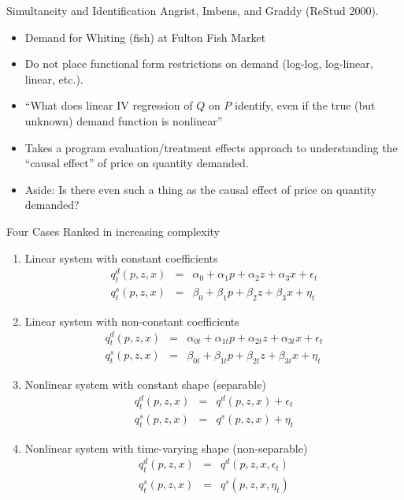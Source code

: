 \documentclass[xcolor=pdftex,dvipsnames,table,mathserif,aspectratio=169]{beamer}
\begin{document}
\begin{frame}{Simultaneity and Identification}
Angrist, Imbens, and Graddy (ReStud 2000).
\begin{itemize}
\item Demand for Whiting (fish) at Fulton Fish Market
\item Do not place functional form restrictions on demand (log-log, log-linear, linear, etc.).
\item ``What does linear IV regression of $Q$ on $P$ identify, even if the true (but unknown) demand function is nonlinear''
\item Takes a program evaluation/treatment effects approach to understanding the ``causal effect'' of price on quantity demanded.
\item Aside: Is there even such a thing as the causal effect of price on quantity demanded?
\end{itemize}
\end{frame}

\begin{frame}{Four Cases}
Ranked in increasing complexity
\footnotesize
\begin{enumerate}
\item Linear system with constant coefficients
\begin{eqnarray*}
q_t^d(p,z,x) &=& \alpha_0 + \alpha_1 p + \alpha_2 z + \alpha_3 x + \epsilon_t \\
q_t^s(p,z,x) &=& \beta_0 + \beta_1 p + \beta_2 z + \beta_3 x + \eta_t
\end{eqnarray*}
\item Linear system with non-constant coefficients
\begin{eqnarray*}
q_t^d(p,z,x) &=& \alpha_{0t} + \alpha_{1t} p + \alpha_{2t} z + \alpha_{3t} x + \epsilon_t \\
q_t^s(p,z,x) &=& \beta_{0t} + \beta_{1t} p + \beta_{2t} z + \beta_{3t} x + \eta_t
\end{eqnarray*}
\item Nonlinear system with constant shape (separable)
\begin{eqnarray*}
q_t^d(p,z,x) &=& q^d(p,z,x)+ \epsilon_t \\
q_t^s(p,z,x) &=& q^s(p,z,x)+ \eta_t
\end{eqnarray*}
\item Nonlinear system with time-varying shape (non-separable)
\begin{eqnarray*}
q_t^d(p,z,x) &=& q^d(p,z,x,\epsilon_t) \\
q_t^s(p,z,x) &=& q^s(p,z,x,\eta_t)
\end{eqnarray*}
\end{enumerate}
\end{frame}
\end{document}
